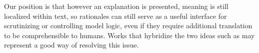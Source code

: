 Our position is that however an explanation is presented, meaning is still localized within text, so rationales can still serve as a useful interface for scrutinizing or controlling model logic, even if they require additional translation to be comprehensible to humans. Works that hybridize the two ideas such as \citet{zhao_lirex_2020} may represent a good way of resolving this issue. 














